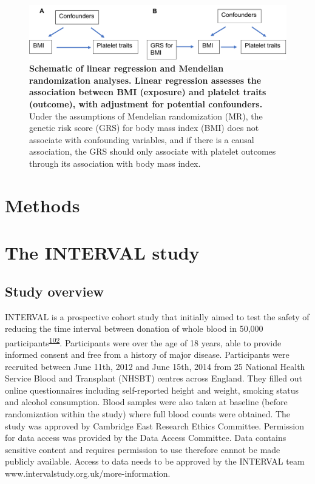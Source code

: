 \documentclass[11pt,twoside]{bristolthesis}
\begin{document}
\begin{figure}
\includegraphics[width=0.8\linewidth]{figure/BMI_platelets/obsvMRexample} \caption[Schematic of linear regression and Mendelian randomization frameworks for BMI and platelet trait analyses]{\textbf{Schematic of linear regression and Mendelian randomization analyses. Linear regression assesses the association between BMI (exposure) and platelet traits (outcome), with adjustment for potential confounders.} Under the assumptions of Mendelian randomization (MR), the genetic risk score (GRS) for body mass index (BMI) does not associate with confounding variables, and if there is a causal association, the GRS should only associate with platelet outcomes through its association with body mass index.}\label{fig:Linear-reg-MR}
\end{figure}
\hypertarget{methods}{%
\section{Methods}\label{methods}}

\hypertarget{INTERVAL-study}{%
\section{The INTERVAL study}\label{INTERVAL-study}}

\hypertarget{study-overview}{%
\subsection{Study overview}\label{study-overview}}

INTERVAL is a prospective cohort study that initially aimed to test the safety of reducing the time interval between donation of whole blood in 50,000 participants\textsuperscript{\protect\hyperlink{ref-DiAngelantonio2017}{102}}. Participants were over the age of 18 years, able to provide informed consent and free from a history of major disease. Participants were recruited between June 11th, 2012 and June 15th, 2014 from 25 National Health Service Blood and Transplant (NHSBT) centres across England. They filled out online questionnaires including self-reported height and weight, smoking status and alcohol consumption. Blood samples were also taken at baseline (before randomization within the study) where full blood counts were obtained. The study was approved by Cambridge East Research Ethics Committee. Permission for data access was provided by the Data Access Committee. Data contains sensitive content and requires permission to use therefore cannot be made publicly available. Access to data needs to be approved by the INTERVAL team www.intervalstudy.org.uk/more-information.
\end{document}
